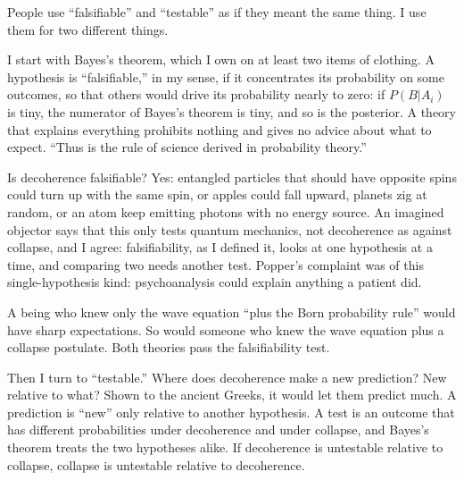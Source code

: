 
People use ``falsifiable'' and ``testable'' as if they meant the same thing. I use them for two different things. 

I start with Bayes's theorem, which I own on at least two items of clothing. A hypothesis is ``falsifiable,'' in my sense, if it concentrates its probability on some outcomes, so that others would drive its probability nearly to zero: if $P(B|A_i)$ is tiny, the numerator of Bayes's theorem is tiny, and so is the posterior. A theory that explains everything prohibits nothing and gives no advice about what to expect. ``Thus is the rule of science derived in probability theory.'' 

Is decoherence falsifiable?  Yes: entangled particles that should have opposite spins could turn up with the same spin, or apples could fall upward, planets zig at random, or an atom keep emitting photons with no energy source. An imagined objector says that this only tests quantum mechanics, not decoherence as against collapse, and I agree: falsifiability, as I defined it, looks at one hypothesis at a time, and comparing two needs another test. Popper's complaint was of this single-hypothesis kind: psychoanalysis could explain anything a patient did. 

A being who knew only the wave equation ``plus the Born probability rule'' would have sharp expectations. So would someone who knew the wave equation plus a collapse postulate. Both theories pass the falsifiability test.

Then I turn to ``testable.'' Where does decoherence make a new prediction? New relative to what? Shown to the ancient Greeks, it would let them predict much. A prediction is ``new'' only relative to another hypothesis. A test is an outcome that has different probabilities under decoherence and under collapse, and Bayes's theorem treats the two hypotheses alike. If decoherence is untestable relative to collapse, collapse is untestable relative to decoherence.

